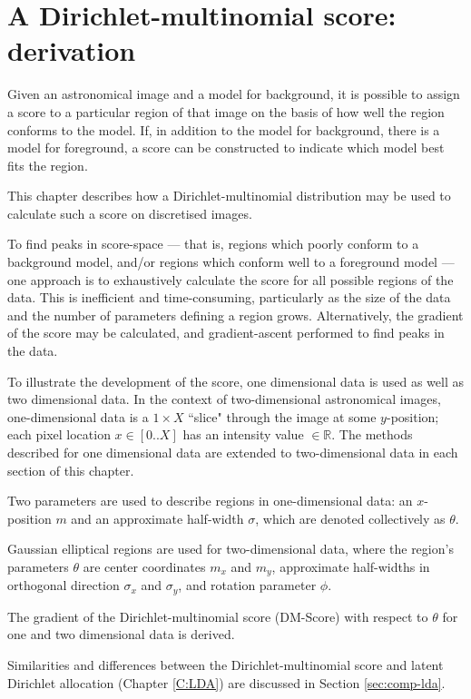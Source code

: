 \chapter{A Dirichlet-multinomial score: derivation}\label{C:1D}

Given an astronomical image and a model for background, it is possible to assign a score to a particular region of that image on the basis of how well the region conforms to the model. If, in addition to the model for background, there is a model for foreground, a score can be constructed to indicate which model best fits the region.

This chapter describes how a Dirichlet-multinomial distribution may be used to calculate such a score on discretised images.

To find peaks in score-space --- that is, regions which poorly conform to a background model, and/or regions which conform well to a foreground model --- one approach is to exhaustively calculate the score for all possible regions of the data. This is inefficient and time-consuming, particularly as the size of the data and the number of parameters defining a region grows. Alternatively, the gradient of the score may be calculated, and gradient-ascent performed to find peaks in the data.

To illustrate the development of the score, one dimensional data is used as well as two dimensional data. In the context of two-dimensional astronomical images, one-dimensional data is a $1 \times X$ ``slice" through the image at some $y$-position; each pixel location $x \in [0..X] $ has an intensity value $\in \mathbb{R}$. The methods described for one dimensional data are extended to two-dimensional data in each section of this chapter.

Two parameters are used to describe regions in one-dimensional data: an $x$-position $m$ and an approximate half-width $\sigma$, which are denoted collectively as $\theta$.

Gaussian elliptical regions are used for two-dimensional data, where the region's parameters $\theta$ are center coordinates $m_x$ and $m_y$, approximate half-widths in orthogonal direction $\sigma_x$ and $\sigma_y$, and rotation parameter $\phi$. 

The gradient of the Dirichlet-multinomial score (DM-Score) with respect to $\theta$ for one and two dimensional data is derived. 

Similarities and differences between the Dirichlet-multinomial score and latent Dirichlet allocation (Chapter \ref{C:LDA}) are discussed in Section \ref{sec:comp-lda}.

